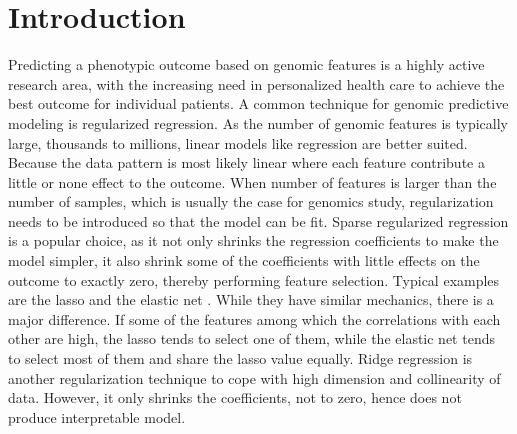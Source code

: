 \section{Introduction}
Predicting a phenotypic outcome based on genomic features is a highly active research area, with the increasing need in personalized health care to achieve the best outcome for individual patients. A common technique for genomic predictive modeling is regularized regression. As the number of genomic features is typically large, thousands to millions, linear models like regression are better suited. Because the data pattern is most likely linear where each feature contribute a little or none effect to the outcome. When number of features is larger than the number of samples, which is usually the case for genomics study, regularization needs to be introduced so that the model can be fit. Sparse regularized regression is a popular choice, as it not only shrinks the regression coefficients to make the model simpler, it also shrink some of the coefficients with little effects on the outcome to exactly zero, thereby performing feature selection. Typical examples are the lasso \citep{tibshirani1996regression} and the elastic net \citep{zou2005regularization}. While they have similar mechanics, there is a major difference. If some of the features among which the correlations with each other are high, the lasso tends to select one of them, while the elastic net tends to select most of them and share the lasso value equally. Ridge regression \citep{hoerl1970ridge} is another regularization technique to cope with high dimension and collinearity of data. However, it only shrinks the coefficients, not to zero, hence does not produce interpretable model. 

